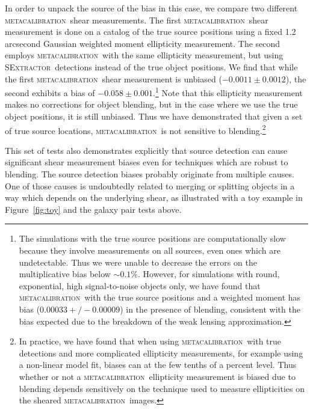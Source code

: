 \documentclass[fleqn,useAMS,usenatbib]{mnras}
\newcommand{\mcal}{\textsc{metacalibration}}
\newcommand{\sx}{\textsc{SExtractor}}
\begin{document}
In order to unpack the source of the bias in this case, we compare two
different \mcal\ shear measurements. The first \mcal\ shear measurement is done
on a catalog of the true source positions using a fixed 1.2 arcsecond Gaussian
weighted moment ellipticity measurement. The second employs \mcal\ with the
same ellipticity measurement, but using \sx\ detections instead of the true
object positions. We find that while the first \mcal\ shear measurement is
unbiased ($-0.0011\pm0.0012$), the second exhibits a bias of
$-0.058\pm0.001$.\footnote{The simulations with the true source positions are
computationally slow because they involve measurements on all sources, even
ones which are undetectable. Thus we were unable to decrease the errors on the
multiplicative bias below $\sim0.1\%$. However, for simulations with round,
exponential, high signal-to-noise objects only, we have found that \mcal\ with
the true source positions and a weighted moment has bias ($0.00033 +/-
0.00009$) in the presence of blending, consistent with the bias expected due to
the breakdown of the weak lensing approximation.} Note that this ellipticity
measurement makes no corrections for object blending, but in the case where we
use the true object positions, it is still unbiased. Thus we have demonstrated
that given a set of true source locations, \mcal\ is not sensitive to
blending.\footnote{In practice, we have found that when using \mcal\ with true
detections and more complicated ellipticity measurements, for example using a
non-linear model fit, biases can at the few tenths of a percent level. Thus
whether or not a \mcal\ ellipticity measurement is biased due to blending
depends sensitively on the technique used to measure ellipticities on the
sheared \mcal\ images.}

This set of tests also demonstrates explicitly that source detection can cause
significant shear measurement biases even for techniques which are robust to
blending. The source detection biases probably originate from multiple causes.
One of those causes is undoubtedly related to merging or splitting objects in a
way which depends on the underlying shear, as illustrated with a toy example in
Figure~\ref{fig:toy} and the galaxy pair tests above.

\end{document}
